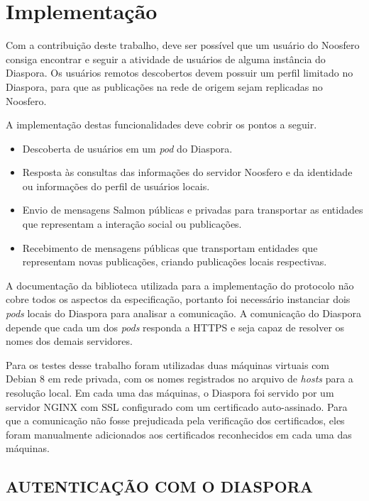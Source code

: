 \chapter{Implementação}

Com a contribuição deste trabalho, deve ser possível que um usuário do Noosfero
consiga encontrar e seguir a atividade de usuários de alguma instância do Diaspora.
Os usuários remotos descobertos devem possuir um perfil limitado no Diaspora, para
que as publicações na rede de origem sejam replicadas no Noosfero.

A implementação destas funcionalidades deve cobrir os pontos a seguir.

\begin{itemize}
  \item{Descoberta de usuários em um \textit{pod} do Diaspora.}
  \item{Resposta às consultas das informações do servidor Noosfero e da identidade
        ou informações do perfil de usuários locais.}
  \item{Envio de mensagens Salmon públicas e privadas para transportar as entidades
        que representam a interação social ou publicações.}
  \item{Recebimento de mensagens públicas que transportam entidades que representam
        novas publicações, criando publicações locais respectivas.}
\end{itemize}

A documentação da biblioteca utilizada para a implementação do protocolo não cobre
todos os aspectos da especificação, portanto foi necessário instanciar dois
\textit{pods} locais do Diaspora para analisar a comunicação. A comunicação do
Diaspora depende que cada um dos \textit{pods} responda a HTTPS e seja capaz de
resolver os nomes dos demais servidores.

Para os testes desse trabalho foram utilizadas duas máquinas virtuais com Debian 8
em rede privada, com os nomes registrados no arquivo de \textit{hosts} para a
resolução local. Em cada uma das máquinas, o Diaspora foi servido por um servidor
NGINX com SSL configurado com um certificado auto-assinado. Para que a comunicação
não fosse prejudicada pela verificação dos certificados, eles foram manualmente
adicionados aos certificados reconhecidos em cada uma das máquinas.

\section{AUTENTICAÇÃO COM O DIASPORA}

